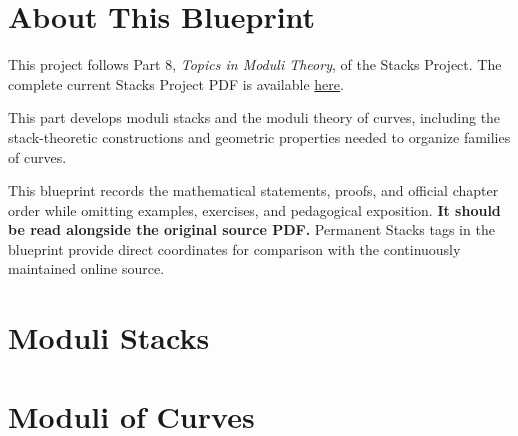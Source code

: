 

\chapter*{About This Blueprint}

This project follows Part 8, \emph{Topics in Moduli Theory}, of the Stacks
Project. The complete current Stacks Project PDF is available
\href{https://stacks.math.columbia.edu/download/book.pdf}{here}.

This part develops moduli stacks and the moduli theory of curves, including
the stack-theoretic constructions and geometric properties needed to organize
families of curves.

This blueprint records the mathematical statements, proofs, and official
chapter order while omitting examples, exercises, and pedagogical exposition.
\textbf{It should be read alongside the original source PDF.} Permanent Stacks
tags in the blueprint provide direct coordinates for comparison with the
continuously maintained online source.

\chapter{Moduli Stacks}
\label{chap:moduli}


\chapter{Moduli of Curves}
\label{chap:moduli-curves}

